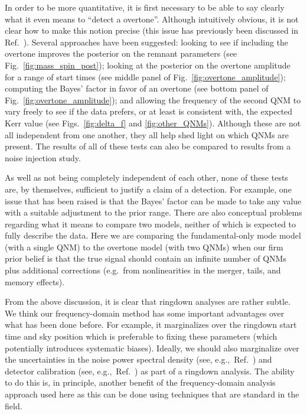 In order to be more quantitative, it is first necessary to be able to say clearly what it even means to ``detect a overtone''. 
Although intuitively obvious, it is not clear how to make this notion precise (this issue has previously been discussed in Ref.~\cite{Isi:2022mhy}). 
Several approaches have been suggested: looking to see if including the overtone improves the posterior on the remnant parameters (see Fig.~\ref{fig:mass_spin_post}); looking at the posterior on the overtone amplitude for a range of start times (see middle panel of Fig.~\ref{fig:overtone_amplitude}); computing the Bayes' factor in favor of an overtone (see bottom panel of Fig.~\ref{fig:overtone_amplitude}); and allowing the frequency of the second QNM to vary freely to see if the data prefers, or at least is consistent with, the expected Kerr value (see Figs.~\ref{fig:delta_f} and \ref{fig:other_QNMs}).
Although these are not all independent from one another, they all help shed light on which QNMs are present. 
The results of all of these tests can also be compared to results from a noise injection study.

As well as not being completely independent of each other, none of these tests are, by themselves, sufficient to justify a claim of a detection.
For example, one issue that has been raised is that the Bayes' factor can be made to take any value with a suitable adjustment to the prior range.
There are also conceptual problems regarding what it means to compare two models, neither of which is expected to fully describe the data. Here we are comparing the fundamental-only mode model (with a single QNM) to the overtone model (with two QNMs) when our firm prior belief is that the true signal should contain an infinite number of QNMs plus additional corrections (e.g.\ from nonlinearities in the merger, tails, and memory effects).

From the above discussion, it is clear that ringdown analyses are rather subtle. 
We think our frequency-domain method has some important advantages over what has been done before. 
For example, it marginalizes over the ringdown start time and sky position which is preferable to fixing these parameters (which potentially introduces systematic biases). 
Ideally, we should also marginalize over the uncertainties in the noise power spectral density (see, e.g.,\ Ref.~\cite{Cornish:2020dwh}) and detector calibration (see, e.g.,\ Ref.~\cite{LIGOScientific:2017aaj}) as part of a ringdown analysis. 
The ability to do this is, in principle, another benefit of the frequency-domain analysis approach used here as this can be done using techniques that are standard in the field.


